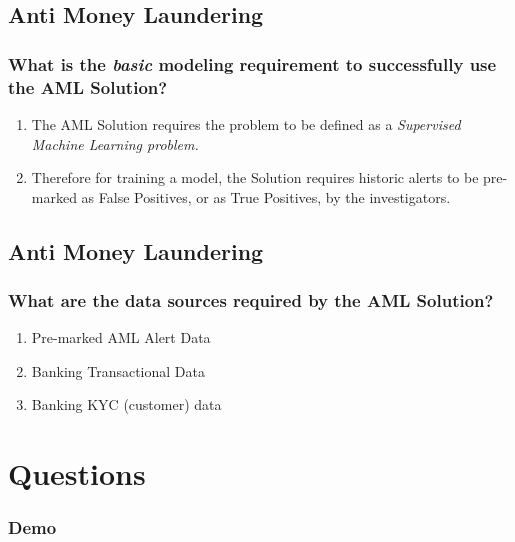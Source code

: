 \documentclass[11pt,
               aspectratio=169,
               hyperref={colorlinks}
               ]{beamer}
\begin{document}
		\subsection{Anti Money Laundering}
	\begin{frame}
		\frametitle{What is the \textit{basic} modeling requirement to successfully use the AML Solution?}
		
		\begin{enumerate}
			\item The AML Solution requires the problem to be defined as a \textit{Supervised Machine Learning problem.}
			\item Therefore for training a model, the Solution requires historic alerts to be pre-marked as False Positives, or as True Positives, by the investigators.
		\end{enumerate}
	\end{frame}

		\subsection{Anti Money Laundering}
	\begin{frame}
		\frametitle{What are the data sources required by the AML Solution?}
		
		\begin{enumerate}
			\item Pre-marked AML Alert Data
			\item Banking Transactional Data
			\item Banking KYC (customer) data
		\end{enumerate}
	\end{frame}

	\section{Questions}

		\begin{frame}

			\frametitle{Demo}

		\end{frame}
\end{document}
